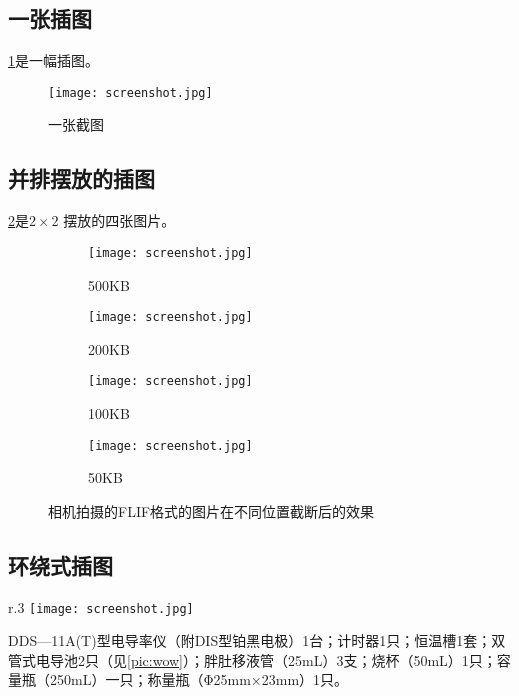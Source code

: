 \documentclass{dreamClass}
\begin{document}
\subsection{一张插图}\label{sec:2}
\cref{pic:desktop}是一幅插图。
\begin{figure}[H]
    \centering
    \texttt{[image: screenshot.jpg]}
    \caption{一张截图}\label{pic:desktop}
\end{figure}

\subsection{并排摆放的插图}
\cref{pic:flag}是\(2 \times 2\) 摆放的四张图片。
\begin{figure}[H]
    \centering
    \begin{subfigure}{.3\textwidth}
        \centering
        \texttt{[image: screenshot.jpg]}
        \caption{500KB}
    \end{subfigure}%
    \begin{subfigure}{.3\textwidth}
        \centering
        \texttt{[image: screenshot.jpg]}
        \caption{200KB}
    \end{subfigure}

    \begin{subfigure}{.3\textwidth}
        \centering
        \texttt{[image: screenshot.jpg]}
        \caption{100KB}
    \end{subfigure}%
    \begin{subfigure}{.3\textwidth}
        \centering
        \texttt{[image: screenshot.jpg]}
        \caption{50KB}
    \end{subfigure}
    \caption{相机拍摄的FLIF格式的图片在不同位置截断后的效果\label{pic:flag}}
\end{figure}

\subsection{环绕式插图}
\begin{wrapfigure}{r}{.3\textwidth}
    \centering
    \texttt{[image: screenshot.jpg]}
    \caption{双管式电导池示意图}\label{pic:wow}
\end{wrapfigure}
DDS—11A(T)型电导率仪（附DIS型铂黑电极）1台；计时器1只；恒温槽1套；双管式电导池2只（见\cref{pic:wow}）；胖肚移液管（25mL）3支；烧杯（50mL）1只；容量瓶（250mL）一只；称量瓶（Φ25mm×23mm）1只。
\end{document}
